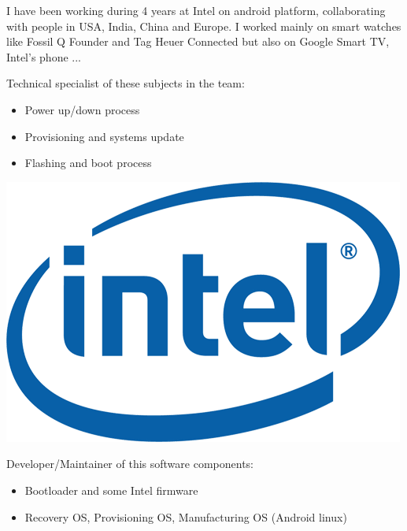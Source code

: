 \documentclass[letterpaper]{jm-cv} %
\begin{document}
\small{

  I have been working during 4 years at Intel on android platform, collaborating with people in USA, India, China and Europe. I worked mainly on smart watches like Fossil Q Founder and Tag Heuer Connected but also on Google Smart TV, Intel's phone ...

  \vspace{0.2cm}
  \begin{minipage}{.7\textwidth}
      {\footnotesize\color{maingray}\bullet} Technical specialist of these subjects in the team:
  \begin{itemize}
  \item[\color{mainblue}\faArrowRight] Power up/down process
  \item[\color{mainblue}\faArrowRight] Provisioning and systems update
  \item[\color{mainblue}\faArrowRight] Flashing and boot process
  \end{itemize}
  \end{minipage}%
  \begin{minipage}{.3\textwidth}
    \center
    \includegraphics[scale=0.13]{logo-intel.png}
  \end{minipage}
  \vspace{0.2cm}

  {\footnotesize\color{maingray}\bullet}  Developer/Maintainer of this software components:
  \vspace{-0.2cm}
  \begin{itemize}
  \item[\color{mainblue}\faArrowRight] Bootloader and some Intel firmware
  \item[\color{mainblue}\faArrowRight] Recovery OS, Provisioning OS, Manufacturing OS (Android linux)
  \end{itemize}

}
\end{document}
